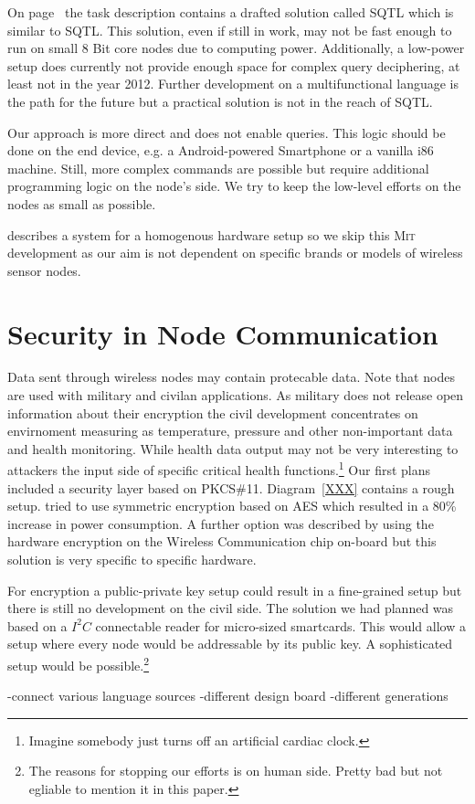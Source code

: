 On page~\pageref{chap:unify} the task description contains a drafted solution called \textsc{SQTL} which is similar to \textsc{SQTL}. This
solution, even if still in work, may not be fast enough to run on small 8 Bit core nodes due to computing power. Additionally, a low-power 
setup does currently not provide enough space for complex query deciphering, at least not in the year 2012. Further development on a 
multifunctional language is the path for the future but a practical solution is not in the reach of \textsc{SQTL}.

Our approach is more direct and does not enable queries. This logic should be done on the end device, e.g. a Android-powered Smartphone or a 
vanilla i86 machine. Still, more complex commands are possible but require additional programming logic on the node's side. We try to 
keep the low-level efforts on the nodes as small as possible.

\cite{Heinzelman00energy-efficientcommunication} describes a system for a homogenous hardware setup so we skip this \textsc{Mit} development as 
our aim is not dependent on specific brands or models of wireless sensor nodes.

\section{Security in Node Communication}

Data sent through wireless nodes may contain protecable data. Note that nodes are used with military and civilan applications. As military does
not release open information about their encryption the civil development concentrates on envirnoment measuring as temperature, pressure and other 
non-important data and health monitoring.\cite{Dispert}
While health data output may not be very interesting to attackers the input side of specific critical health functions.\footnote{Imagine somebody 
just turns off an artificial cardiac clock.}
Our first plans included a security layer based on \textsc{PKCS\#11}. Diagram~\ref{XXX} contains a rough setup. \cite{UBISEMINAR} tried to 
use symmetric encryption based on \textsc{AES} which resulted in a 80\% increase in power consumption. A further option was described by 
using the hardware encryption on the Wireless Communication chip on-board but this solution is very specific to specific hardware.

For encryption a public-private key setup could result in a fine-grained setup but there is still no development on the civil side.
The solution we had planned was based on a \(I^2C\) connectable reader for micro-sized smartcards. This would allow a setup where every node
would be addressable by its public key. A sophisticated setup would be possible.\footnote{The reasons for stopping our efforts is on human side. Pretty
bad but not egliable to mention it in this paper.}


-connect various language sources
-different design board
-different generations
